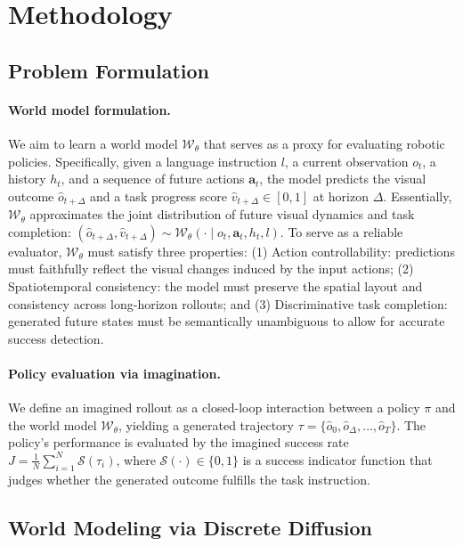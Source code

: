 \section{Methodology}
\subsection{Problem Formulation}
\label{sec:formulation}

\paragraph{World model formulation.}
We aim to learn a world model $\mathcal{W}_\theta$ that serves as a proxy for evaluating robotic policies.
Specifically, given a language instruction $l$, a current observation $o_t$, a history $h_t$, and a sequence of future actions $\mathbf{a}_t$, the model predicts the visual outcome $\hat{o}_{t+\Delta}$ and a task progress score $\hat{v}_{t+\Delta} \in [0,1]$ at horizon $\Delta$.
Essentially, $\mathcal{W}_\theta$ approximates the joint distribution of future visual dynamics and task completion: $(\hat{o}_{t+\Delta}, \hat{v}_{t+\Delta}) \sim \mathcal{W}_\theta(\cdot \mid o_t, \mathbf{a}_t, h_t, l)$.
To serve as a reliable evaluator, $\mathcal{W}_\theta$ must satisfy three properties:
(1) Action controllability: predictions must faithfully reflect the visual changes induced by the input actions;
(2) Spatiotemporal consistency: the model must preserve the spatial layout and consistency across long-horizon rollouts; and
(3) Discriminative task completion: generated future states must be semantically unambiguous to allow for accurate success detection.

\paragraph{Policy evaluation via imagination.}
We define an imagined rollout as a closed-loop interaction between a policy $\pi$ and the world model $\mathcal{W}_\theta$, yielding a generated trajectory $\tau = \{\hat{o}_0, \hat{o}_\Delta, \dots, \hat{o}_T\}$.
The policy's performance is evaluated by the imagined success rate $J = \frac{1}{N}\sum_{i=1}^N \mathcal{S}(\tau_i)$, where $\mathcal{S}(\cdot) \in \{0,1\}$ is a success indicator function that judges whether the generated outcome fulfills the task instruction.


\subsection{World Modeling via Discrete Diffusion}
\label{sec:architecture}

